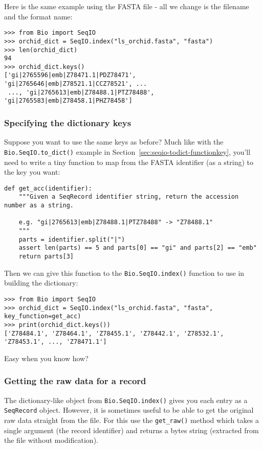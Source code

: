 Here is the same example using the FASTA file - all we change is the
filename and the format name:

\begin{verbatim}
>>> from Bio import SeqIO
>>> orchid_dict = SeqIO.index("ls_orchid.fasta", "fasta")
>>> len(orchid_dict)
94
>>> orchid_dict.keys()
['gi|2765596|emb|Z78471.1|PDZ78471', 'gi|2765646|emb|Z78521.1|CCZ78521', ...
 ..., 'gi|2765613|emb|Z78488.1|PTZ78488', 'gi|2765583|emb|Z78458.1|PHZ78458']
\end{verbatim}

\subsubsection{Specifying the dictionary keys}
\label{sec:seqio-index-functionkey}

Suppose you want to use the same keys as before? Much like with the
\verb|Bio.SeqIO.to_dict()| example in Section~\ref{sec:seqio-todict-functionkey},
you'll need to write a tiny function to map from the FASTA identifier
(as a string) to the key you want:

\begin{verbatim}
def get_acc(identifier):
    """Given a SeqRecord identifier string, return the accession number as a string.

    e.g. "gi|2765613|emb|Z78488.1|PTZ78488" -> "Z78488.1"
    """
    parts = identifier.split("|")
    assert len(parts) == 5 and parts[0] == "gi" and parts[2] == "emb"
    return parts[3]
\end{verbatim}

\noindent Then we can give this function to the \verb|Bio.SeqIO.index()|
function to use in building the dictionary:

\begin{verbatim}
>>> from Bio import SeqIO
>>> orchid_dict = SeqIO.index("ls_orchid.fasta", "fasta", key_function=get_acc)
>>> print(orchid_dict.keys())
['Z78484.1', 'Z78464.1', 'Z78455.1', 'Z78442.1', 'Z78532.1', 'Z78453.1', ..., 'Z78471.1']
\end{verbatim}

\noindent Easy when you know how?

\subsubsection{Getting the raw data for a record}
\label{sec:seqio-index-getraw}

The dictionary-like object from \verb|Bio.SeqIO.index()| gives you each
entry as a \verb|SeqRecord| object. However, it is sometimes useful to
be able to get the original raw data straight from the file. For this
use the \verb|get_raw()| method which takes a
single argument (the record identifier) and returns a bytes string
(extracted from the file without modification).

